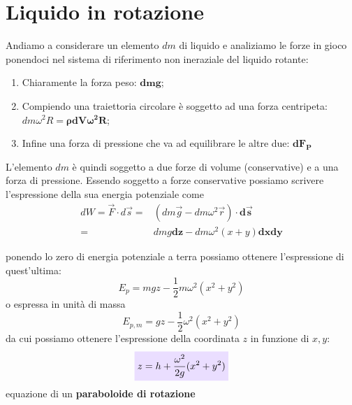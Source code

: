 \documentclass[x11names]{report}
\newcommand{\viola}[1]{\colorbox{yred}{$\displaystyle #1$}}
\begin{document}
	\section{Liquido in rotazione}
	Andiamo a considerare un elemento \(dm\) di liquido e analiziamo le forze in gioco ponendoci nel sistema di riferimento non ineraziale del liquido rotante: 
	\begin{enumerate}
		\item Chiaramente la forza peso: \(\boldsymbol{dmg}\);
		\item Compiendo una traiettoria circolare è soggetto ad una forza centripeta: \(dm\omega^2R = \boldsymbol{\rho dV\omega^2 R}\);
		\item Infine una forza di pressione che va ad equilibrare le altre due: \(\boldsymbol{dF_{P}}\)
	\end{enumerate}
	L'elemento \(dm\) è quindi soggetto a due forze di volume (conservative) e a una forza di pressione. Essendo soggetto a forze conservative possiamo scrivere l'espressione della sua energia potenziale come
	\begin{align*}
		dW = \overrightarrow{F} \cdot d\vec{s} =& (dm \vec{g} - dm \omega^2 \vec{r}) \cdot \boldsymbol{d\vec{s}}\\
		   									   =& dmg\boldsymbol{dz} - dm \omega^2(x+y)\boldsymbol{dxdy}
	\end{align*} 
	\begin{minipage}{0.5\textwidth}
		ponendo lo zero di energia potenziale a terra possiamo ottenere l'espressione di quest'ultima:
		\[ 
		E_{p} = mgz - \frac{1}{2}m\omega ^2(x^2 + y^2)
		\]
		o espressa in unità di massa
		\[ 
		E_{p,m} = gz - \frac{1}{2}\omega ^2(x^2 + y^2)
		\]
		da cui possiamo ottenere l'espressione della coordinata \(z\) in funzione di \(x,y\):
		\begin{equation}
			\viola{z = h +\frac{\omega ^2}{2g}(x^2 +y^2)}
		\end{equation}
		equazione di un \textbf{paraboloide di rotazione}
	\end{minipage}
\end{document}
